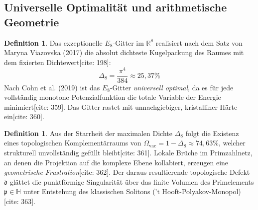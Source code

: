 \documentclass[11pt,a4paper]{article}
\newcommand{\R}{\mathbb{R}}
\newcommand{\Halg}{\mathbb{H}}
\newcommand{\Eoct}{E_8}
\theoremstyle{definition}
\newtheorem{definition}[theorem]{Definition}
\begin{document}
	\subsection{Universelle Optimalität und arithmetische Geometrie}
	\begin{definition}
		Das exzeptionelle $\Eoct$-Gitter im $\R^8$ realisiert nach dem Satz von Maryna Viazovska (2017) die absolut dichteste Kugelpackung des Raumes mit dem fixierten Dichtewert[cite: 198]:
		\begin{equation}
			\Delta_8 = \frac{\pi^4}{384} \approx 25{,}37\%
		\end{equation}
		Nach Cohn et al. (2019) ist das $\Eoct$-Gitter \textit{universell optimal}, da es für jede vollständig monotone Potenzialfunktion die totale Variable der Energie minimiert[cite: 359]. Das Gitter rastet mit unnachgiebiger, kristalliner Härte ein[cite: 360].
	\end{definition}
	
	\begin{definition}
		Aus der Starrheit der maximalen Dichte $\Delta_8$ folgt die Existenz eines topologischen Komplementärraums von $\Omega_{\text{vac}} = 1 - \Delta_8 \approx 74{,}63\%$, welcher strukturell unvollständig gefüllt bleibt[cite: 361]. Lokale Brüche im Primzahlnetz, an denen die Projektion auf die komplexe Ebene kollabiert, erzeugen eine \textit{geometrische Frustration}[cite: 362]. Der daraus resultierende topologische Defekt $\mathfrak{d}$ glättet die punktförmige Singularität über das finite Volumen des Primelements $\mathfrak{p} \in \Halg$ unter Entstehung des klassischen Solitons ('t Hooft-Polyakov-Monopol)[cite: 363].
	\end{definition}
	
\end{document}
